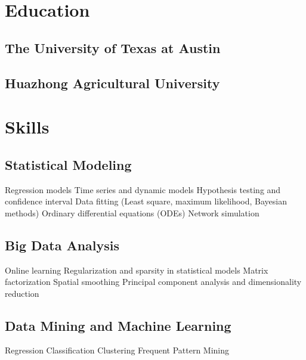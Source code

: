\documentclass[]{deedy-resume-openfont}
\begin{document}
\begin{minipage}[t]{0.3\textwidth}


\section{Education}

\subsection{The University of Texas at Austin}
\sectionsep

\subsection{Huazhong Agricultural University}
\sectionsep

\sectionsep


\section{Skills}
\subsection{Statistical Modeling}
Regression models \textbullet{}
Time series and dynamic models \textbullet{}
Hypothesis testing and confidence interval \textbullet{}
Data fitting (Least square, maximum likelihood, Bayesian methods) \textbullet{}
Ordinary differential equations (ODEs) \textbullet{}
Network simulation
\sectionsep

\subsection{Big Data Analysis}
Online learning \textbullet{}
Regularization and sparsity in statistical models \textbullet{}
Matrix factorization \textbullet{}
Spatial smoothing \textbullet{}
Principal component analysis and dimensionality reduction
\sectionsep

\subsection{Data Mining and Machine Learning}
Regression \textbullet{}
Classification \textbullet{}
Clustering \textbullet{}
Frequent Pattern Mining
\sectionsep


\end{minipage}
\end{document}
